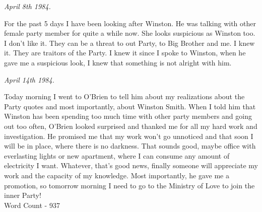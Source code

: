 \documentclass[12pt,a4paper]{article}
\begin{document}
\begin{flushleft}
  \textit{April 8th 1984.}
  \end{flushleft}

For the past 5 days I have been looking after Winston. He was talking with other female party member for quite a while now.  She looks suspicious as Winston too. I don't like it. They can be a threat to out Party, to Big Brother and me. I knew it. They are traitors of the Party. I knew it since I spoke to Winston, when he gave me a suspicious look, I knew that something is not alright with him.\\

\begin{flushleft}
  \textit{April 14th 1984.}
  \end{flushleft}

Today morning I went to O'Brien to tell him about my realizations about the Party quotes and most importantly, about Winston Smith. When I told him that Winston has been spending too much time with other party members and going out too often, O'Brien looked surprised and thanked me for all my hard work and investigation. He promised me that my work won't go unnoticed and that soon I will be in place, where there is no darkness. That sounds good, maybe office with everlasting lights or new apartment, where I can consume any amount of electricity I want. Whatever, that's good news, finally someone will appreciate my work and the capacity of my knowledge. Most importantly, he gave me a promotion, so tomorrow morning I need to go to the Ministry of Love to join the inner Party!  \\

Word Count - 937

  
\end{document}
